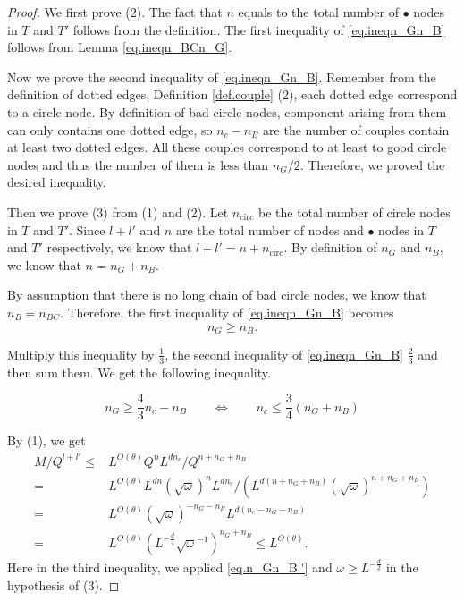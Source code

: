 \begin{proof} We first prove (2). The fact that $n$ equals to the total number of $\bullet$ nodes in $T$ and $T'$ follows from the definition. The first inequality of \eqref{eq.ineqn_Gn_B} follows from Lemma \ref{eq.ineqn_BCn_G}. 
    
Now we prove the second inequality of \eqref{eq.ineqn_Gn_B}. Remember from the definition of dotted edges, Definition \ref{def.couple} (2), each dotted edge correspond to a circle node. By definition of bad circle nodes, component arising from them can only contains one dotted edge, so $n_c - n_B$ are the number of couples contain at least two dotted edges. All these couples correspond to at least to good circle nodes and thus the number of them is less than $n_G/2$. Therefore, we proved the desired inequality.

Then we prove (3) from (1) and (2). Let $n_{\text{circ}}$ be the total number of circle nodes in $T$ and $T'$. Since $l+l'$ and $n$ are the total number of nodes and $\bullet$ nodes in $T$ and $T'$ respectively, we know that $l+l' = n + n_{\text{circ}}$. By definition of $n_G$ and $n_B$, we know that $n_{} = n_{G} + n_{B}$. 

By assumption that there is no long chain of bad circle nodes, we know that $n_{B} = n_{BC}$. Therefore, the first inequality of \eqref{eq.ineqn_Gn_B} becomes
\begin{equation}\label{eq.n_Gn_B'}
    n_{G} \ge n_{B}.
\end{equation}

Multiply this inequality by $\frac{1}{3}$, the second inequality of \eqref{eq.ineqn_Gn_B} $\frac{2}{3}$ and then sum them. We get the following inequality.

\begin{equation}\label{eq.n_Gn_B''}
    n_{G} \ge \frac{4}{3}n_c - n_{B}\qquad \Leftrightarrow\qquad n_c \le \frac{3}{4} (n_{G} + n_{B}) 
\end{equation}

By (1), we get 
\begin{equation}
    \begin{split}
        M/Q^{l+l'}\leq& L^{O(\theta)} Q^{n} L^{dn_c}/Q^{n+n_G+n_B}
        \\
        =& L^{O(\theta)} L^{dn} (\sqrt{\omega})^{n}L^{dn_c}/(L^{d(n+n_G+n_B)}(\sqrt{\omega})^{n+n_G+n_B})
        \\
        =& L^{O(\theta)} (\sqrt{\omega})^{-n_G-n_B}L^{d(n_c-n_G-n_B)}
        \\
        =& L^{O(\theta)} (L^{-\frac{d}{4}}\sqrt{\omega}^{-1})^{n_G+n_B}\le L^{O(\theta)}.
    \end{split}
\end{equation}
Here in the third inequality, we applied \eqref{eq.n_Gn_B''} and $\omega \ge L^{-\frac{d}{2}}$ in the hypothesis of (3).


\end{proof}
